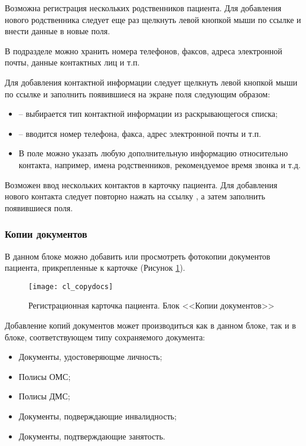 {Возможна регистрация нескольких родственников пациента. Для добавления нового родственника следует еще раз щелкнуть левой кнопкой мыши по ссылке  и внести данные в новые поля.

В подразделе  можно хранить номера телефонов, факсов, адреса электронной почты, данные контактных лиц и т.п. 

Для добавления контактной информации следует щелкнуть левой кнопкой мыши по ссылке  и заполнить появившиеся на экране поля следующим образом:
\begin{itemize}
 \item {} -- выбирается тип контактной информации из раскрывающегося списка;
 \item {} -- вводится номер телефона, факса, адрес электронной почты и т.п.
 \item В поле  можно указать любую дополнительную информацию относительно контакта, например, имена родственников, рекомендуемое время звонка и т.д.
\end{itemize} 

Возможен ввод нескольких контактов в карточку пациента. Для добавления нового контакта следует повторно нажать на ссылку , а затем заполнить появившиеся поля.


\subsubsection{Копии документов} \label{cl_copydocs}

В данном блоке можно добавить или просмотреть фотокопии документов пациента, прикрепленные к карточке (Рисунок \ref{img_cl_copydocs}). 

\begin{figure}[ht!]\centering
 \texttt{[image: cl\_copydocs]}
 \caption{Регистрационная карточка пациента. Блок <<Копии документов>>}
 \label{img_cl_copydocs}
\end{figure} 

Добавление копий документов может производиться как в данном блоке, так и в блоке, соответствующем типу сохраняемого документа:
\begin{itemize}
 \item Документы, удостоверяющме личность;
 \item Полисы ОМС;
 \item Полисы ДМС;
 \item Документы, подверждающие инвалидность;
 \item Документы, подтверждающие занятость.
\end{itemize}

}
